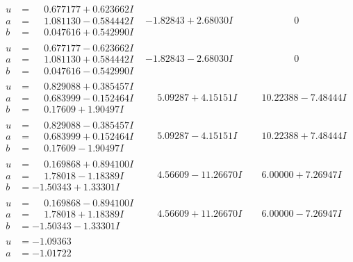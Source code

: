 \documentclass[1p]{elsarticle_modified}
\theoremstyle{definition}
\begin{document}
$$\begin{array}{c|c|c}
\begin{aligned}
u &= \phantom{-}0.677177 + 0.623662 I \\
a &= \phantom{-}1.081130 - 0.584442 I \\
b &= \phantom{-}0.047616 + 0.542990 I\end{aligned}
 & -1.82843 + 2.68030 I & \phantom{-0.000000 } 0 \\ \hline\begin{aligned}
u &= \phantom{-}0.677177 - 0.623662 I \\
a &= \phantom{-}1.081130 + 0.584442 I \\
b &= \phantom{-}0.047616 - 0.542990 I\end{aligned}
 & -1.82843 - 2.68030 I & \phantom{-0.000000 } 0 \\ \hline\begin{aligned}
u &= \phantom{-}0.829088 + 0.385457 I \\
a &= \phantom{-}0.683999 - 0.152464 I \\
b &= \phantom{-}0.17609 + 1.90497 I\end{aligned}
 & \phantom{-}5.09287 + 4.15151 I & \phantom{-}10.22388 - 7.48444 I \\ \hline\begin{aligned}
u &= \phantom{-}0.829088 - 0.385457 I \\
a &= \phantom{-}0.683999 + 0.152464 I \\
b &= \phantom{-}0.17609 - 1.90497 I\end{aligned}
 & \phantom{-}5.09287 - 4.15151 I & \phantom{-}10.22388 + 7.48444 I \\ \hline\begin{aligned}
u &= \phantom{-}0.169868 + 0.894100 I \\
a &= \phantom{-}1.78018 - 1.18389 I \\
b &= -1.50343 + 1.33301 I\end{aligned}
 & \phantom{-}4.56609 - 11.26670 I & \phantom{-}6.00000 + 7.26947 I \\ \hline\begin{aligned}
u &= \phantom{-}0.169868 - 0.894100 I \\
a &= \phantom{-}1.78018 + 1.18389 I \\
b &= -1.50343 - 1.33301 I\end{aligned}
 & \phantom{-}4.56609 + 11.26670 I & \phantom{-}6.00000 - 7.26947 I \\ \hline\begin{aligned}
u &= -1.09363\phantom{ +0.000000I} \\
a &= -1.01722\phantom{ +0.000000I} \\

\end{aligned}
\end{array}$$
\end{document}
